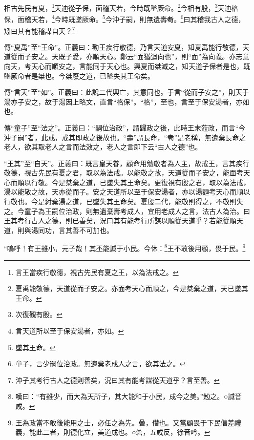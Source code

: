 相古先民有夏，\footnote{言王當疾行敬德，視古先民有夏之王，以為法戒之。}天迪從子保，面稽天若，今時既墜厥命。\footnote{夏禹能敬德，天道從而子安之。亦面考天心而順之，今是桀棄之道，天已墜其王命。}今相有殷，\footnote{次復觀有殷。}天迪格保，面稽天若，\footnote{言天道所以至于保安湯者，亦如。}今時既墜厥命。\footnote{墜其王命。}今沖子嗣，則無遺壽耇。\footnote{童子，言少嗣位治政。無遺棄老成人之言，欲其法之。}曰其稽我古人之德，矧曰其有能稽謀自天？\footnote{沖子其考行古人之德則善矣，況曰其有能考謀從天道乎？言至善。}


{\noindent\zhuan{}\fzbyks 傳“夏禹”至“王命”。正義曰：勸王疾行敬德，乃言天道安夏，知夏禹能行敬德，天道從而子安之。天既子愛，亦順天心。鄭云“面猶迴向也”，則“面”為向義。亦志意向天，考天心而順安之，言能同于天心也。興夏而桀滅之，知天道子保者是也，既墜厥命者是桀也。今桀廢之道，已墜失其王命矣。 \par}

{\noindent\zhuan{}\fzbyks 傳“言天”至“如”。正義曰：此說二代興亡，其意同也。于言“從而子安之”，則天于湯亦子安之，故于湯因上略文，直言“格保”。“格”，至也，言至于保安湯者，亦如也。 \par}

{\noindent\zhuan{}\fzbyks 傳“童子”至“法之”。正義曰：“嗣位治政”，謂歸政之後，此時王末蒞政，而言“今沖子嗣”者，此戒，戒其即政之後故也。“壽”謂長命，“耇”是老稱，無遺棄長命之老人，欲其取老人之言而法效之，老人之言即下云“古人之德”也。 \par}

{\noindent\shu{}\fzkt “王其”至“自天”。正義曰：既言皇天眷，顧命用勉敬者為人主，故戒王，言其疾行敬德，視古先民有夏之君，取以為法戒。以能敬之故，天道從而子安之，能面考天心而順以行敬。今是桀棄之道，已墜失其王命矣。更復視有殷之君，取以為法戒，湯以能敬之故，天亦從而子。安之天道所以至于保安湯者，亦以湯麵考天心而順以行敬也。今是紂棄湯之道，已墜失其王命矣。夏殷二代，能敬則得之，不敬則失之。今童子為王嗣位治政，則無遺棄壽考成人，宜用老成人之言，法古人為治。曰王其考行古人之德，則已善矣，況曰其有能考行所謀以順從天道乎？若能從順天道，則與湯同功，言其善不可加也。 \par}

“嗚呼！有王雖小，元子哉！其丕能諴于小民。今休：\footnote{嘆曰：“有雖少，而大為天所子，其大能和于小民，成今之美。”勉之。○諴音咸。}王不敢後用顧，畏于民。\footnote{王為政當不敢後能用之士，必任之為先。碞，僣也。又當顧畏于下民僣差禮義，能此二者，則德化立，美道成也。○碞，五咸反，徐音吟。}


